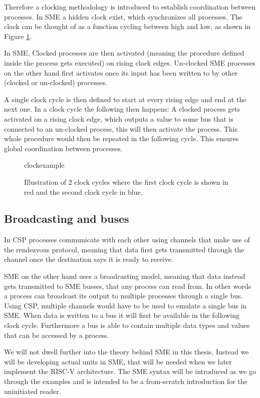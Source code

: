         Therefore a clocking methodology is introduced to establish coordination between processes. In SME a hidden clock exist, which synchronizes all processes. The clock can be thought of as a function cycling between high and low, as shown in Figure \ref{fig:clockexample}. 
        
        In SME, Clocked processes are then activated (meaning the procedure defined inside the process gets executed) on rising clock edges. Un-clocked SME processes on the other hand first activates once its input has been written to by other (clocked or un-clocked) processes. 
        
        A single clock cycle is then defined to start at every rising edge and end at the next one. In a clock cycle the following then happens: A clocked process gets activated on a rising clock edge, which outputs a value to some bus that is connected to an un-clocked process, this will then activate the process. This whole procedure would then be repeated in the following cycle. This ensures global coordination between processes.
        
        \begin{figure}[h!]
            \centering
            {clockexample}
            \caption{Illustration of 2 clock cycles where the first clock cycle is shown in red and the second clock cycle in blue.}
            \label{fig:clockexample}
        \end{figure}
    
    \subsection{Broadcasting and buses}
        In CSP processes communicate with each other using channels that make use of the rendezvous protocol, meaning that data first gets transmitted through the channel once the destination says it is ready to receive. 
        
        SME on the other hand uses a broadcasting model, meaning that data instead gets transmitted to SME busses, that any process can read from. In other words a process can broadcast its output to multiple processes through a single bus. Using CSP, multiple channels would have to be used to emulate a single bus in SME. When data is written to a bus it will first be available in the following clock cycle. Furthermore a bus is able to contain multiple data types and values that can be accessed by a process. 
        
        We will not dwell further into the theory behind SME in this thesis. Instead we will be developing actual units in SME, that will be needed when we later implement the RISC-V architecture. The SME syntax will be introduced as we go through the examples and is intended to be a from-scratch introduction for the uninitiated reader. 

